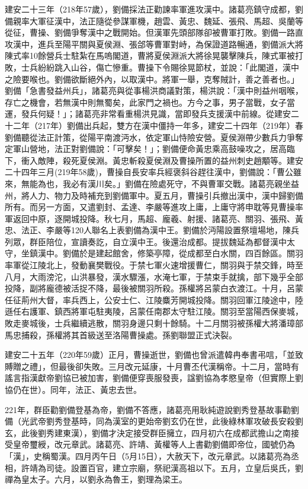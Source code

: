 建安二十三年（218年57歲），劉備採法正勸諫率軍進攻漢中。諸葛亮鎮守成都，劉備親率大軍征漢中，法正隨從參謀軍機，趙雲、黃忠、魏延、張飛、馬超、吳蘭等從征，曹操、劉備爭奪漢中之戰開始。但漢軍先頭部隊卻被曹軍打敗。劉備一路直攻漢中，進兵至陽平關與夏侯淵、張郃等曹軍對峙，為保證道路暢通，劉備派大將陳式率10餘營兵士駐紮在馬嗚閣道，曹將夏侯淵派大將徐晃襲擊陳兵，陳式軍被打敗，士兵紛紛跳入山谷，傷亡慘重。曹操下令賜徐晃節杖，並說：「此閣道，漢中之險要喉也。劉備欲斷絕外內，以取漢中。將軍一舉，克奪賊計，善之善者也。」劉備「急書發益州兵」，諸葛亮與從事楊洪商議對策，楊洪說：「漢中則益州咽喉，存亡之機會，若無漢中則無蜀矣，此家門之禍也。方今之事，男子當戰，女子當運，發兵何疑！」；諸葛亮非常看重楊洪見識，當即發兵支援漢中前線。從建安二十二年（217年）劉備出兵起，雙方在漢中僵持一年多，建安二十四年（219年）春劉備聽從法正計策，從陽平南渡沔水，依定軍山恃險安營。夏侯淵帶少數兵力爭奪定軍山營地，法正對劉備說：「可擊矣！」；劉備便命黃忠乘高鼓噪攻之，居高臨下，衝入敵陣，殺死夏侯淵。黃忠斬殺夏侯淵及曹操所置的益州刺史趙顒等。建安二十四年三月(219年58歲)，曹操自長安率兵經褒斜谷趕往漢中，劉備說：「曹公雖來，無能為也，我必有漢川矣。」劉備在險處死守，不與曹軍交戰。諸葛亮親坐益州，將人力、物力及時補充到劉備軍中。夏五月，曹操引兵撤出漢中，漢中歸劉備所有。而另一方面，又遣劉封、孟達、李嚴等進攻上庸，上庸守將申耽等見曹操率軍返回中原，逐開城投降。秋七月，馬超、龐羲、射援、諸葛亮、關羽、張飛、黃忠、法正、李嚴等120人聯名上表劉備為漢中王。劉備於沔陽設置祭壇場地，陳兵列眾，群臣陪位，宣讀奏訖，自立漢中王。後還治成都。提拔魏延為都督漢中太守，坐鎮漢中。劉備於是建起館舍，修築亭障，從成都至白水關，四百餘區。關羽率軍從江陵北上，發動襄樊戰役。于禁七軍火速增援曹仁，關羽與于禁交鋒，時至八月，大雨滂沱，山洪暴發，漢水驟漲，水淹七軍，于禁束手就擒，部下幾乎全部投降，副將龐德被活捉不降，最後被關羽所殺。孫權將呂蒙白衣渡江。十月，呂蒙任征荊州大督，率兵西上，公安士仁、江陵麋芳開城投降。關羽回軍江陵途中，陸遜任右護軍、鎮西將軍屯駐夷陵，呂蒙任南郡太守駐江陵。關羽至當陽西保麥城，敗走麥城後，士兵繼續逃散，關羽身邊只剩十餘騎。十二月關羽被孫權大將潘璋部馬忠捕殺，孫權將其首級送至洛陽曹操處。孫劉聯盟正式決裂。

建安二十五年（220年59歲）正月，曹操逝世，劉備也曾派遣韓冉奉書弔唁，「並致賻贈之禮」，但最後卻失敗。三月改元延康，十月曹丕代漢稱帝。十二月，當時有謠言指漢獻帝劉協已被加害，劉備便穿喪服發喪，諡劉協為孝愍皇帝（但實際上劉協仍在世）。同年，法正、黃忠去世。

221年，群臣勸劉備登基為帝，劉備不答應，諸葛亮用耿純遊說劉秀登基故事勸劉備（光武帝劉秀登基時，同為漢室的更始帝劉玄仍在世，此後綠林軍攻破長安殺劉玄，此後劉秀建東漢），劉備才決定接受群臣擁立，四月初六在成都武擔山之南接受皇帝璽綬，改元章武。諸葛亮、許靖、黃權等人上書勸劉備即帝位，國號仍為「漢」，史稱蜀漢。四月丙午日（5月15日），大赦天下，改元章武。以諸葛亮為丞相，許靖為司徒。設置百官，建立宗廟，祭祀漢高祖以下。五月，立皇后吳氏，劉禪為皇太子。六月，以劉永為魯王，劉理為梁王。

